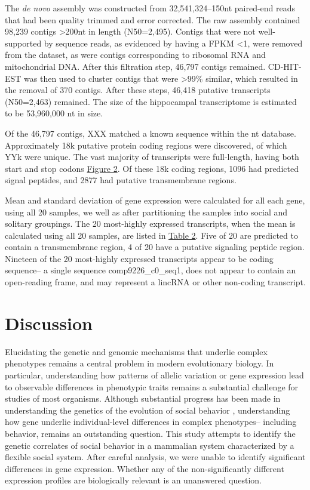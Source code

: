 \documentclass[10.5pt]{article}
\begin{document}
The \textit{de novo} assembly was constructed from 32,541,324--150nt paired-end reads that had been quality trimmed and error corrected. The raw assembly contained 98,239 contigs \textgreater 200nt in length (N50=2,495). Contigs that were not well-supported by sequence reads, as evidenced by having a FPKM \textless 1, were removed from the dataset, as were contigs corresponding to ribosomal RNA and mitochondrial DNA.  After this filtration step, 46,797 contigs remained.  CD-HIT-EST was then used to cluster contigs that were \textgreater 99\% similar, which resulted in the removal of 370 contigs.  After these steps, 46,418 putative transcripts (N50=2,463) remained. The size of the hippocampal transcriptome is estimated to be 53,960,000 nt in size. 

Of the 46,797 contigs, XXX matched a known sequence within the nt database. Approximately 18k putative protein coding regions were discovered, of which YYk were unique. The vast majority of transcripts were full-length, having both start and stop codons \hyperlink{Figure 2}{Figure 2}.  Of these 18k coding regions, 1096 had predicted signal peptides,  and 2877 had putative transmembrane regions.  

Mean and standard deviation of gene expression were calculated for all each gene, using all 20 samples, we well as after partitioning the samples into social and solitary groupings.  The 20 most-highly expressed transcripts, when the mean is calculated using all 20 samples, are listed in \hyperlink{Table 2}{Table 2}. Five of 20 are predicted to contain a transmembrane region, 4 of 20 have a putative signaling peptide region. Nineteen of the 20 most-highly expressed transcripts appear to be coding sequence-- a single sequence comp9226\_c0\_seq1, does not appear to contain an open-reading frame, and may represent a lincRNA or other non-coding transcript.  

            

\section*{Discussion}

\hspace{4mm} Elucidating the genetic and genomic mechanisms that underlie complex phenotypes remains a central problem in modern evolutionary biology. In particular, understanding how patterns of allelic variation or gene expression lead to observable differences in phenotypic traits remains a substantial challenge for studies of most organisms. Although substantial progress has been made in understanding the genetics of the evolution of social behavior \citep{Woodard:2011jv}, understanding how gene underlie individual-level differences in complex phenotypes-- including behavior, remains an outstanding question.  This study attempts to identify the genetic correlates of social behavior in a mammalian system characterized by a flexible social system.  After careful analysis, we were unable to identify significant differences in gene expression. Whether any of the non-significantly different expression profiles are biologically relevant is an unanswered question. \\
\end{document}
